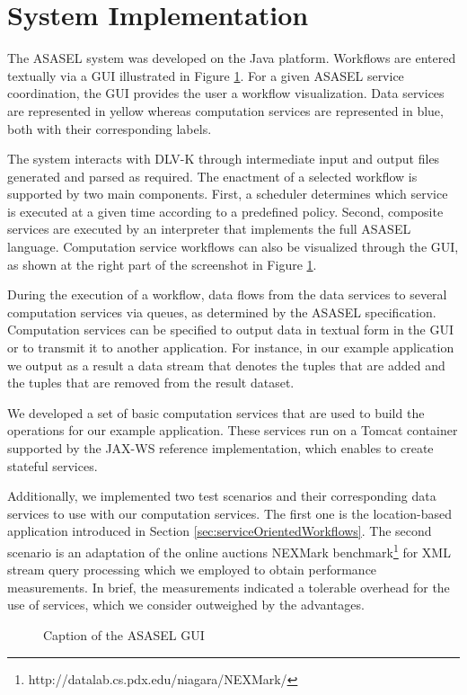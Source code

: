 
\section{System Implementation} \label{sec:asasel:demo}
	
The ASASEL system was developed on the Java platform. Workflows are entered textually via a GUI illustrated in Figure \ref{fig:asaselGUI}. For a given ASASEL service coordination, the GUI provides the user a workflow visualization. Data services are represented in yellow whereas computation services are represented in blue, both with their corresponding labels.

The system interacts with DLV-K through intermediate input and output files generated and parsed as required. The enactment of a selected workflow is supported by two main components. First, a scheduler determines which service is executed at a given time according to a predefined policy. Second, composite services are executed by an interpreter that implements the full ASASEL language. Computation service workflows can also be visualized through the GUI, as shown at the right part of the screenshot in Figure \ref{fig:asaselGUI}.
	
During the execution of a workflow, data flows from the data services to several computation services via queues, as determined by the ASASEL specification. Computation services can be specified to output data in textual form in the GUI or to transmit it to another application. For instance, in our example application we output as a result a data stream that denotes the tuples that are added and the tuples that are removed from the result dataset.
	
We developed a set of basic computation services that are used to build the operations for our example application. These services run on a Tomcat container supported by the JAX-WS reference implementation, which enables to create stateful services.
	
Additionally, we implemented two test scenarios and their corresponding data services to use with our computation services. The first one is the location-based application introduced in Section \ref{sec:serviceOrientedWorkflows}. The second scenario is an adaptation of the online auctions NEXMark benchmark\footnote{http://datalab.cs.pdx.edu/niagara/NEXMark/} for XML stream query processing which we employed to obtain performance measurements. In brief, the measurements indicated a tolerable overhead for the use of services, which we consider outweighed by the advantages.
	
	
	\begin{figure}
   \begin{center}
   \end{center}
   \caption{Caption of the ASASEL GUI}
   \label{fig:asaselGUI}
\end{figure}

